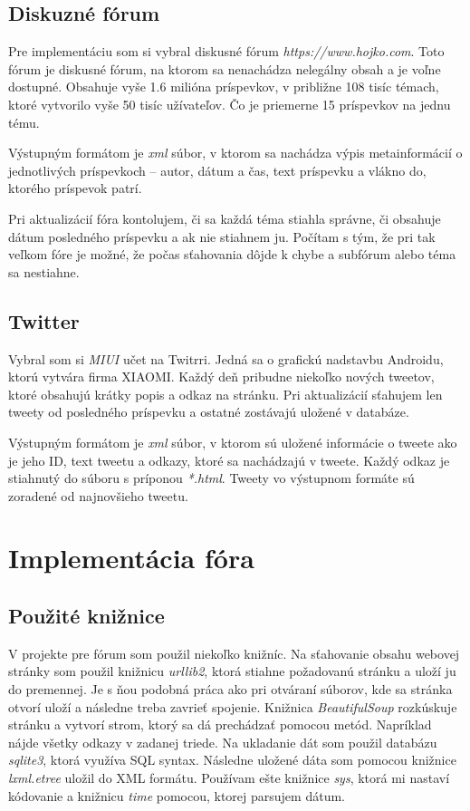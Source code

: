 \documentclass[11pt, a4paper, titlepage] {article}
\begin{document}
\subsection{Diskuzné fórum}
Pre implementáciu som si vybral diskusné fórum \emph{https://www.hojko.com}. Toto fórum je diskusné fórum, na ktorom sa nenachádza nelegálny obsah a je voľne dostupné. Obsahuje vyše 1.6 milióna príspevkov, v približne 108 tisíc témach, ktoré vytvorilo vyše 50 tisíc užívateľov. Čo je priemerne 15 príspevkov na jednu tému.

Výstupným formátom je \emph{xml} súbor, v ktorom sa nachádza výpis metainformácií o jednotlivých príspevkoch -- autor, dátum a čas, text príspevku a vlákno do, ktorého príspevok patrí.

Pri aktualizácií fóra kontolujem, či sa každá téma stiahla správne, či obsahuje dátum posledného príspevku a ak nie stiahnem ju. Počítam s tým, že pri tak veľkom fóre je možné, že počas sťahovania dôjde k chybe a subfórum alebo téma sa nestiahne. 

\subsection{Twitter}
Vybral som si \emph{MIUI} učet na Twitrri. Jedná sa o grafickú nadstavbu Androidu, ktorú vytvára firma XIAOMI. Každý deň pribudne niekoľko nových tweetov, ktoré obsahujú krátky popis a odkaz na stránku.  Pri aktualizácií sťahujem len tweety od posledného príspevku a ostatné zostávajú uložené v databáze. 

Výstupným formátom je \emph{xml} súbor, v ktorom  sú uložené informácie o tweete ako je jeho ID, text tweetu a odkazy, ktoré sa nachádzajú v tweete. Každý odkaz je stiahnutý do súboru s príponou \emph{*.html}. Tweety vo výstupnom formáte sú zoradené od najnovšieho tweetu.
\newpage

\section{Implementácia fóra}
\subsection{Použité knižnice}
V projekte pre fórum som použil niekoľko knižníc. Na sťahovanie obsahu webovej stránky som použil knižnicu \emph{urllib2}, ktorá stiahne požadovanú stránku a uloží ju do premennej. Je s ňou podobná práca ako pri otváraní súborov, kde sa stránka otvorí uloží a následne treba zavrieť spojenie. Knižnica \emph{BeautifulSoup} rozkúskuje stránku a vytvorí strom, ktorý sa dá prechádzať pomocou metód. Napríklad nájde všetky odkazy v zadanej triede. Na ukladanie dát som použil databázu \emph{sqlite3}, ktorá využíva SQL syntax. Následne uložené dáta som pomocou knižnice \emph{lxml.etree} uložil do XML formátu. Používam ešte knižnice \emph{sys}, ktorá mi nastaví kódovanie a knižnicu \emph{time} pomocou, ktorej parsujem dátum.
\end{document}
